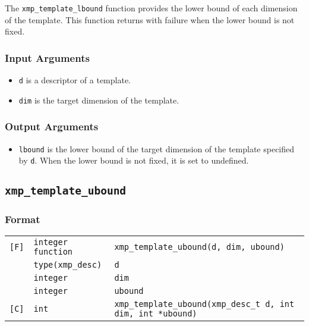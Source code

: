 The {\tt xmp\_template\_lbound} function provides the lower bound of each
dimension of the template. This function returns with failure when the
lower bound is not fixed.

\subsubsection*{Input Arguments}
\begin{itemize}
 \item {\tt d} is a descriptor of a template.
 \item {\tt dim} is the target dimension of the template.
\end{itemize}

\subsubsection*{Output Arguments}
\begin{itemize}
 \item {\tt lbound} is the lower bound of the target dimension of the
       template specified by {\tt d}.  When the lower bound is not
       fixed, it is set to undefined.
\end{itemize}


\subsection{\tt xmp\_template\_ubound}

\subsubsection*{Format}

\begin{tabular}{lll}

\verb![F]!& {\tt integer function}& {\tt xmp\_template\_ubound(d, dim, ubound)}\\
          & {\tt type(xmp\_desc)} & {\tt d}\\
          & {\tt integer} & {\tt dim}\\
          & {\tt integer} & {\tt ubound}\\

\verb![C]!&  {\tt int}& {\tt xmp\_template\_ubound(xmp\_desc\_t d, int dim, int *ubound)}\\

\end{tabular}

